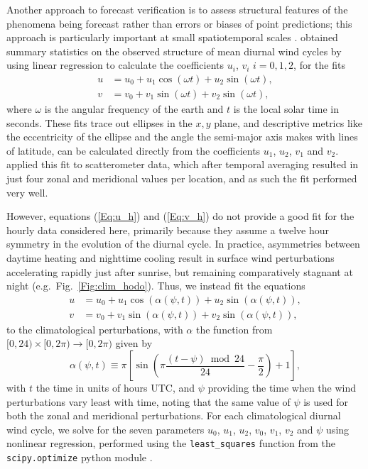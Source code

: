 \documentclass[twocol]{ametsoc}
\begin{document}
Another approach to forecast verification is to assess structural features of the phenomena being forecast rather than errors or biases of point predictions; this approach is particularly important at small spatiotemporal scales \citep[e.g.][]{mass02, rife05}. \citet{gille05} obtained summary statistics on the observed structure of mean diurnal wind cycles by using linear regression to calculate the coefficients $u_i$, $v_i$ $i=0,1,2$, for the fits 
\begin{align}
u &= u_0 + u_1 \cos(\omega t) + u_2 \sin(\omega t), \label{Eq:u_h} \\
v &= v_0 + v_1 \sin(\omega t) + v_2 \sin(\omega t), \label{Eq:v_h}
\end{align}
where $\omega$ is the angular frequency of the earth and $t$ is the local solar time in seconds. These fits trace out ellipses in the $x,y$ plane, and descriptive metrics like the eccentricity of the ellipse and the angle the semi-major axis makes with lines of latitude, can be calculated directly from the coefficients $u_1$, $u_2$, $v_1$ and $v_2$. \citet{gille05} applied this fit to scatterometer data, which after temporal averaging resulted in just four zonal and meridional values per location, and as such the fit performed very well.  

However, equations (\ref{Eq:u_h}) and (\ref{Eq:v_h}) do not provide a good fit for the hourly data considered here, primarily because they assume a twelve hour symmetry in the evolution of the diurnal cycle. In practice, asymmetries between daytime heating and nighttime cooling \citep[e.g.][]{svensson11} result in surface wind perturbations accelerating rapidly just after sunrise, but remaining comparatively stagnant at night (e.g.~Fig.~\ref{Fig:clim_hodo}). Thus, we instead fit the equations
\begin{align}
u &= u_0 + u_1 \cos(\alpha(\psi,t)) + u_2 \sin(\alpha(\psi,t)), \label{Eq:u} \\
v &= v_0 + v_1 \sin(\alpha(\psi,t)) + v_2 \sin(\alpha(\psi,t)), \label{Eq:v}
\end{align}
to the climatological perturbations, with $\alpha$ the function from $[0,24) \times [0, 2\pi) \to [0, 2\pi)$ given by
\begin{equation}
\alpha(\psi,t) \equiv \pi \left[\sin\left( \pi \frac{(t - \psi)  \bmod 24}{24} - \frac{\pi}{2} \right) + 1 \right], \label{Eq:alpha}
\end{equation}
with $t$ the time in units of hours UTC, and $\psi$ providing the time when the wind perturbations vary least with time, noting that the same value of $\psi$ is used for both the zonal and meridional perturbations. For each climatological diurnal wind cycle, we solve for the seven parameters $u_0$, $u_1$, $u_2$, $v_0$, $v_1$, $v_2$ and $\psi$ using nonlinear regression, performed using the \texttt{least\_squares} function from the \texttt{scipy.optimize} python module \citep{scipy19}.
\end{document}
